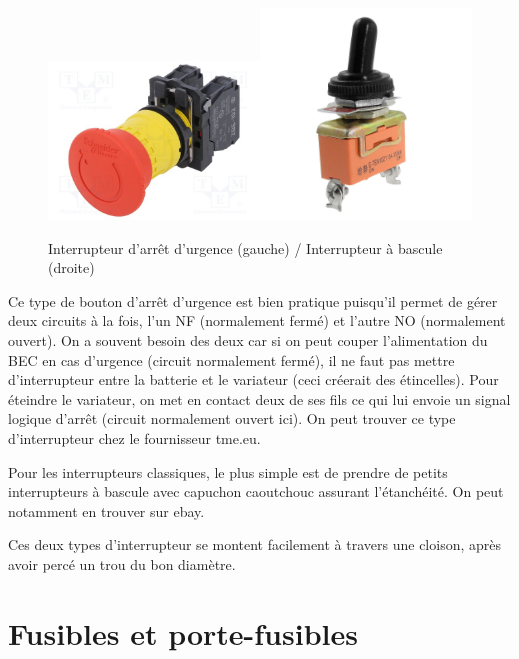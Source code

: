 \documentclass[a4paper, 11pt]{report}
\begin{document}
\begin{figure}[h]
\caption{Interrupteur d'arrêt d'urgence (gauche) / Interrupteur à bascule (droite) }

\centering{}\includegraphics[width=0.5\textwidth]{images/arret_urgence}\includegraphics[width=0.5\textwidth]{images/interr_etanche}
\end{figure}

Ce type de bouton d'arrêt d'urgence est bien pratique puisqu'il permet
de gérer deux circuits à la fois, l'un NF (normalement fermé) et l'autre
NO (normalement ouvert). On a souvent besoin des deux car si on peut
couper l'alimentation du BEC en cas d'urgence (circuit normalement
fermé), il ne faut pas mettre d'interrupteur entre la batterie et
le variateur (ceci créerait des étincelles). Pour éteindre le variateur,
on met en contact deux de ses fils ce qui lui envoie un signal logique
d'arrêt (circuit normalement ouvert ici). On peut trouver ce type
d'interrupteur chez le fournisseur tme.eu. 

Pour les interrupteurs classiques, le plus simple est de prendre de
petits interrupteurs à bascule avec capuchon caoutchouc assurant l'étanchéité.
On peut notamment en trouver sur ebay.

Ces deux types d'interrupteur se montent facilement à travers une
cloison, après avoir percé un trou du bon diamètre.

\section{Fusibles et porte-fusibles}
\end{document}
